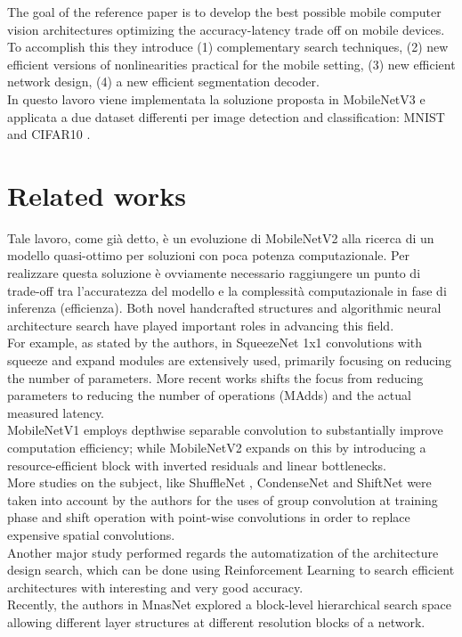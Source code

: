 \documentclass[12pt, letterpaper, twoside]{article}
\begin{document}
The goal of the reference paper is to develop the best possible mobile computer vision architectures optimizing the accuracy-latency trade off on mobile devices. To accomplish this they introduce (1) complementary search techniques, (2) new efficient versions of nonlinearities practical for the mobile setting, (3) new efficient network design, (4) a new efficient segmentation decoder.\\
In questo lavoro viene implementata la soluzione proposta in MobileNetV3 e applicata a due dataset differenti per image detection and classification: MNIST \cite{deng2012mnist} and CIFAR10 \cite{Krizhevsky09learningmultiple}.

\section{Related works}
Tale lavoro, come già detto, è un evoluzione di MobileNetV2 alla ricerca di un modello quasi-ottimo per soluzioni con poca potenza computazionale. Per realizzare questa soluzione è ovviamente necessario raggiungere un punto di trade-off tra l'accuratezza del modello e la complessità computazionale in fase di inferenza (efficienza). Both novel handcrafted structures and algorithmic neural architecture search have played important roles in advancing this field.\\

For example, as stated by the authors, in SqueezeNet \cite{iandola2016squeezenet} 1x1 convolutions with squeeze and expand modules are extensively used, primarily focusing on reducing the number of parameters. More recent works shifts the focus from reducing parameters to reducing the number of operations (MAdds) and the actual measured latency. \\ 
MobileNetV1 \cite{howard2017mobilenets} employs depthwise separable convolution to substantially improve computation efficiency; while MobileNetV2 \cite{sandler2019mobilenetv2} expands on this by introducing a resource-efficient block with inverted residuals and linear bottlenecks. \\
More studies on the subject, like ShuffleNet \cite{zhang2017shufflenet}, CondenseNet \cite{huang2018condensenet} and ShiftNet \cite{yan2018shiftnet} were taken into account by the authors for the uses of group convolution at training phase and shift operation with point-wise convolutions in order to replace expensive spatial convolutions. \\

Another major study performed regards the automatization of the architecture design search, which can be done using Reinforcement Learning to search efficient architectures with interesting and very good accuracy.\\
Recently, the authors in MnasNet \cite{tan2019mnasnet} explored a block-level hierarchical search space allowing different layer structures at different resolution blocks of a network.\\
\end{document}

